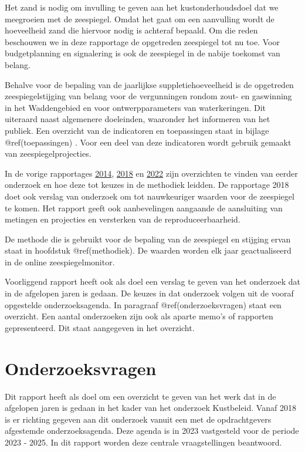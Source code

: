 \documentclass[ddraft]{deltares_report}
\begin{document}
Het zand is nodig om invulling te geven aan het kustonderhoudsdoel dat
we meegroeien met de zeespiegel. Omdat het gaat om een aanvulling wordt
de hoeveelheid zand die hiervoor nodig is achteraf bepaald. Om die reden
beschouwen we in deze rapportage de opgetreden zeespiegel tot nu toe.
Voor budgetplanning en signalering is ook de zeespiegel in de nabije
toekomst van belang.

Behalve voor de bepaling van de jaarlijkse suppletiehoeveelheid is de
opgetreden zeespiegelstijging van belang voor de vergunningen rondom
zout- en gaswinning in het Waddengebied en voor ontwerpparameters van
waterkeringen. Dit uiteraard naast algemenere doeleinden, waaronder het
informeren van het publiek. Een overzicht van de indicatoren en
toepassingen staat in bijlage @ref(toepassingen) . Voor een deel van
deze indicatoren wordt gebruik gemaakt van zeespiegelprojecties.

In de vorige rapportages
\href{https://publications.deltares.nl/1209426_202.pdf}{2014},
\href{https://www.deltares.nl/app/uploads/2019/03/Zeespiegelmonitor-2018-final.pdf}{2018}
en \href{https://publications.deltares.nl/11209266_000.pdf}{2022} zijn
overzichten te vinden van eerder onderzoek en hoe deze tot keuzes in de
methodiek leidden. De rapportage 2018 doet ook verslag van onderzoek om
tot nauwkeuriger waarden voor de zeespiegel te komen. Het rapport geeft
ook aanbevelingen aangaande de aansluiting van metingen en projecties en
versterken van de reproduceerbaarheid.

De methode die is gebruikt voor de bepaling van de zeespiegel en
stijging ervan staat in hoofdstuk @ref(methodiek). De waarden worden elk
jaar geactualiseerd in de online zeespiegelmonitor.

Voorliggend rapport heeft ook als doel een verslag te geven van het
onderzoek dat in de afgelopen jaren is gedaan. De keuzes in dat
onderzoek volgen uit de vooraf opgestelde onderzoeksagenda. In paragraaf
@ref(onderzoeksvragen) staat een overzicht. Een aantal onderzoeken zijn
ook als aparte memo's of rapporten gepresenteerd. Dit staat aangegeven
in het overzicht.

\section{Onderzoeksvragen}\label{onderzoeksvragen}

Dit rapport heeft als doel om een overzicht te geven van het werk dat in
de afgelopen jaren is gedaan in het kader van het onderzoek Kustbeleid.
Vanaf 2018 is er richting gegeven aan dit onderzoek vanuit een met de
opdrachtgevers afgestemde onderzoeksagenda. Deze agenda is in 2023
vastgesteld voor de periode 2023 - 2025. In dit rapport worden deze
centrale vraagstellingen beantwoord.
\end{document}
